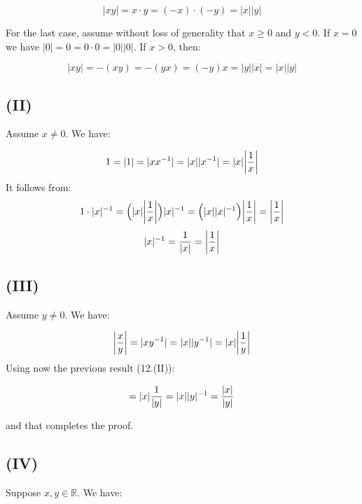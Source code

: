 \documentclass{article}
\begin{document}
\begin{equation*}
	|xy| = x \cdot y = (-x) \cdot (-y) = |x||y|
\end{equation*}

For the last case, assume without loss of generality that \(x \geq 0\) and \(y < 0\). If \(x = 0\) we
have \(|0| = 0 = 0 \cdot 0 = |0||0|\). If \(x > 0\), then:

\begin{equation*}
	|xy| = -(xy) = -(yx) = (-y)x = |y||x| = |x||y|
\end{equation*}

\subsection*{(II)}

Assume \(x \neq 0\). We have:

\begin{equation*}
	1 = |1| = |xx^{-1}| = |x||x^{-1}| = |x|\abs{\frac{1}{x}}
\end{equation*}
It follows from:
\begin{equation*}
	1 \cdot |x|^{-1} = \Big(|x|\abs{\frac{1}{x}}\Big)|x|^{-1} = \Big(|x||x|^{-1}\Big)\abs{\frac{1}{x}} = \abs{\frac{1}{x}}
\end{equation*}
\begin{equation*}
	|x|^{-1} = \frac{1}{|x|} =  \abs{\frac{1}{x}}
\end{equation*}

\subsection*{(III)}

Assume \(y \neq 0\). We have:

\begin{equation*}
	\abs{\frac{x}{y}} = |xy^{-1}| = |x||y^{-1}| = |x|\abs{\frac{1}{y}}
\end{equation*}
Using now the previous result (12.(II)):

\begin{equation*}
	= |x|\frac{1}{\abs{y}} = |x||y|^{-1} = \frac{\abs{x}}{\abs{y}}
\end{equation*}

and that completes the proof.

\subsection*{(IV)}

Suppose \(x, y\in \mathbb{R}\). We have:
\end{document}

